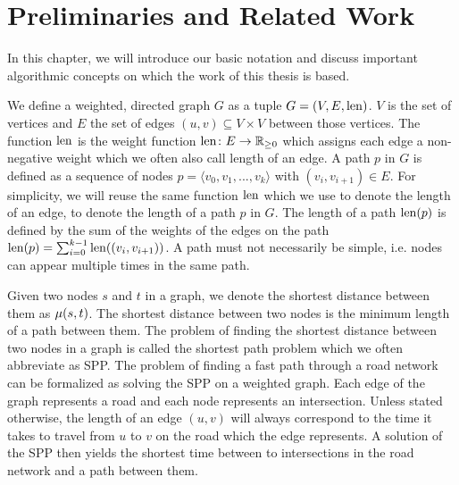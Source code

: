 
\chapter{Preliminaries and Related Work}
\label{ch:preliminaries}
In this chapter, we will introduce our basic notation and discuss important algorithmic concepts on which the work of this thesis is based.

We define a weighted, directed graph $G$ as a tuple $G=(V,E,\operatorname{len})$. $V$ is the set of vertices and $E$ the set of edges $(u,v) \subseteq V \times V$ between those vertices. The function $\operatorname{len}$ is the weight function $\operatorname{len}\colon E \rightarrow \mathbb{R}_{\ge 0}$ which assigns each edge a non-negative weight which we often also call length of an edge. A path $p$ in $G$ is defined as a sequence of nodes $p = \langle v_0,v_1,...,v_k \rangle$ with $(v_i,v_{i+1}) \in E$. For simplicity, we will reuse the same function $\operatorname{len}$ which we use to denote the length of an edge, to denote the length of a path $p$ in $G$. The length of a path $\operatorname{len}(p)$ is defined by the sum of the weights of the edges on the path $\operatorname{len}(p) = \sum_{i=0}^{k-1}{\operatorname{len}((v_i,v_{i+1}))}$. A path must not necessarily be simple, i.e. nodes can appear multiple times in the same path.

Given two nodes $s$ and $t$ in a graph, we denote the shortest distance between them as $\mu(s,t)$. The shortest distance between two nodes is the minimum length of a path between them. The problem of finding the shortest distance between two nodes in a graph is called the shortest path problem which we often abbreviate as SPP. The problem of finding a fast path through a road network can be formalized as solving the SPP on a weighted graph. Each edge of the graph represents a road and each node represents an intersection. Unless stated otherwise, the length  of an edge $(u,v)$ will always correspond to the time it takes to travel from $u$ to $v$ on the road which the edge represents. A solution of the SPP then yields the shortest time between to intersections in the road network and a path between them.

